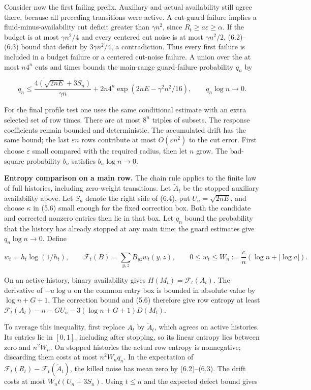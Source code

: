 \documentclass[english,11pt,a4paper]{article}
\begin{document}
Consider now the first failing prefix. Auxiliary and actual availability still agree there, because all preceding transitions were active. A cut-guard failure implies a fluid-minus-availability cut deficit greater than \(\gamma n^2\), since \(R_t\ge a\varepsilon\ge\alpha\). If the budget is at most \(\gamma n^2/4\) and every centered cut noise is at most \(\gamma n^2/2\), (6.2)--(6.3) bound that deficit by \(3\gamma n^2/4\), a contradiction. Thus every first failure is included in a budget failure or a centered cut-noise failure. A union over the at most \(n4^n\) cuts and times bounds the main-range guard-failure probability \(q_n\) by

\nopagebreak[4]
\[q_n\le\frac{4(\sqrt{2nE}+3S_n)}{\gamma n}
+2n4^n\exp(2nE-\gamma^2n^2/16),\qquad q_n\log n\longrightarrow0.
\tag{6.4'}\]

For the final profile test one uses the same conditional estimate with an extra selected set of row times. There are at most \(8^n\) triples of subsets. The response coefficients remain bounded and deterministic. The accumulated drift has the same bound; the last \(\varepsilon n\) rows contribute at most \(O(\varepsilon n^2)\) to the cut error. First choose \(\varepsilon\) small compared with the required radius, then let \(n\) grow. The bad-square probability \(b_n\) satisfies \(b_n\log n\to0\).

\textbf{Entropy comparison on a main row.} The chain rule applies to the finite law of full histories, including zero-weight transitions. Let \(\widetilde A_t\) be the stopped auxiliary availability above. Let \(S_n\) denote the right side of (6.4), put \(U_n=\sqrt{2nE}\), and choose \(\kappa\) in (5.6) small enough for the fixed correction box. Both the candidate and corrected nonzero entries then lie in that box. Let \(q_n\) bound the probability that the history has already stopped at any main time; the guard estimates give \(q_n\log n\to0\). Define

\nopagebreak[4]
\[w_t=h_t\log(1/h_t),\qquad
\mathcal F_t(B)=\sum_{y,z}B_{yz}w_t(y,z),\qquad
0\le w_t\le W_n:=\frac cn(\log n+|\log a|).\tag{6.4a}\]

On an active history, binary availability gives \(H(M_t)=\mathcal F_t(A_t)\). The derivative of \(-u\log u\) on the common entry box is bounded in absolute value by \(\log n+G+1\). The correction bound and (5.6) therefore give row entropy at least \(\mathcal F_t(A_t)-n-GU_n-3(\log n+G+1)D(M_t)\).

To average this inequality, first replace \(A_t\) by \(\widetilde A_t\), which agrees on active histories. Its entries lie in \([0,1]\), including after stopping, so its linear entropy lies between zero and \(n^2W_n\). On stopped histories the actual row entropy is nonnegative; discarding them costs at most \(n^2W_nq_n\). In the expectation of \(\mathcal F_t(R_t)-\mathcal F_t(\widetilde A_t)\), the killed noise has mean zero by (6.2)--(6.3). The drift costs at most \(W_nt(U_n+3S_n)\). Using \(t\le n\) and the expected defect bound gives
\end{document}
